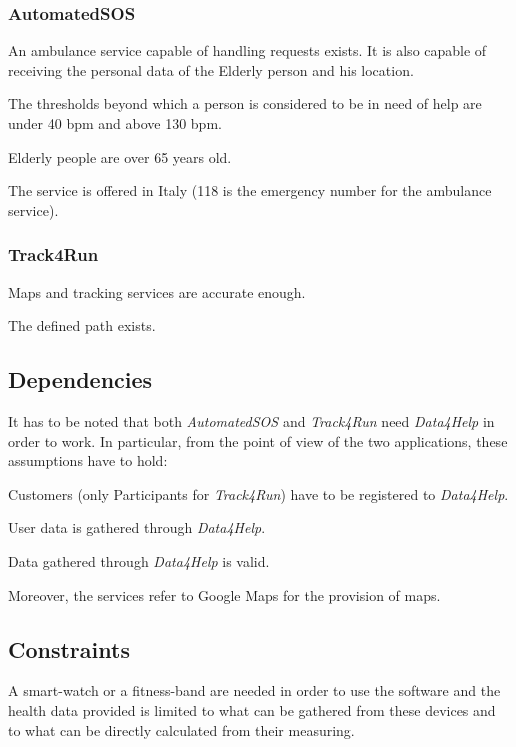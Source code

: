         \subsubsection{AutomatedSOS}
            \begin{enumerate}[label={[}D2.\arabic*{]}]
                \item An ambulance service capable of handling requests exists. It is also capable of receiving the personal data of the Elderly person and his location.
                
                \item The thresholds beyond which a person is considered to be in need of help are under 40 bpm and above 130 bpm.
                
                \item Elderly people are over 65 years old.
                
                \item The service is offered in Italy (118 is the emergency number for the ambulance service).
            \end{enumerate}
            
            \subsubsection{Track4Run}
                \begin{enumerate}[label={[}D3.\arabic*{]}]
                    \item Maps and tracking services are accurate enough.
                    
                    \item The defined path exists.
                \end{enumerate}
                
    \subsection{Dependencies}
        It has to be noted that both \emph{AutomatedSOS} and \emph{Track4Run} need \emph{Data4Help} in order to work. In particular, from the point of view of the two applications, these assumptions have to hold:
        \begin{enumerate}[label={[}D2-3.\arabic*{]}, leftmargin=*]
            \item Customers (only Participants for \emph{Track4Run}) have to be registered to \emph{Data4Help}.
            
            \item User data is gathered through \emph{Data4Help}.
            
            \item Data gathered through \emph{Data4Help} is valid. \\
        \end{enumerate}
        Moreover, the services refer to Google Maps for the provision of maps.
        
    \subsection{Constraints}
        A smart-watch or a fitness-band are needed in order to use the software and the health data provided is limited to what can be gathered from these devices and to what can be directly calculated from their measuring.
